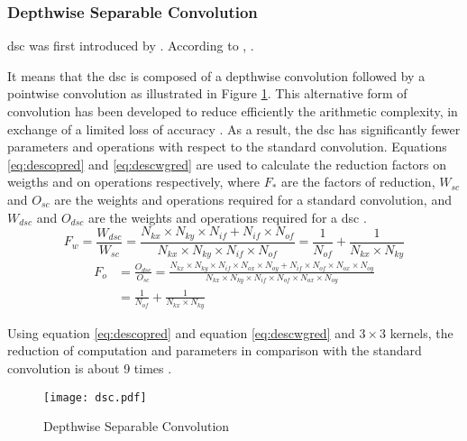 \subsubsection{Depthwise Separable Convolution}  \label{subs:dsc}
\acrfull{dsc} was first introduced by \textcite{sifre_rigid-motion_2014}. According to \textcite{chollet_xception_2017}, .

It means that the \acrshort{dsc} is composed of a depthwise convolution followed by a pointwise convolution as illustrated in Figure \ref{fig:dsc}. This alternative form of convolution has been developed to reduce efficiently the arithmetic complexity, in exchange of a limited loss of accuracy \cite{liu_fpga-based_2019}. As a result, the \acrshort{dsc} has significantly fewer parameters and operations with respect to the standard convolution. Equations \eqref{eq:descopred} and \eqref{eq:descwgred} are used to calculate the reduction factors on weigths and on operations respectively, where $F_{*}$ are the factors of reduction, $W_{sc}$ and $O_{sc}$ are the weights and operations required for a standard convolution, and $W_{dsc}$ and $O_{dsc}$ are the weights and operations required for a \acrshort{dsc} \cite{liu_fpga-based_2019}.
%
\begin{equation}
    F_w = \frac{W_{dsc}}{W_{sc}} =
    \frac{N_{kx} \times N_{ky} \times N_{if} + N_{if} \times N_{of}}{N_{kx} \times N_{ky} \times N_{if} \times N_{of}} =
    \frac{1}{N_{of}} + \frac{1}{N_{kx} \times N_{ky}}
    \label{eq:descopred}
\end{equation}
\begin{equation}
    \begin{split}
        F_o &= \frac{O_{dsc}}{O_{sc}} = \frac{N_{kx} \times N_{ky} \times N_{if} \times N_{ox} \times N_{oy} + N_{if} \times N_{of} \times N_{ox} \times N_{oy}}{N_{kx} \times N_{ky} \times N_{if} \times N_{of} \times N_{ox} \times N_{oy}} \\
        &= \frac{1}{N_{of}} + \frac{1}{N_{kx} \times N_{ky}}
    \end{split}
    \label{eq:descwgred}
\end{equation}

Using equation \eqref{eq:descopred} and equation \eqref{eq:descwgred} and $3 \times 3$ kernels, the reduction of computation and parameters in comparison with the standard convolution is about 9 times \cite{zhang_channel_2019}.
%
\begin{figure}
    \texttt{[image: dsc.pdf]}
    \caption{Depthwise Separable Convolution}
    \label{fig:dsc}
\end{figure}
